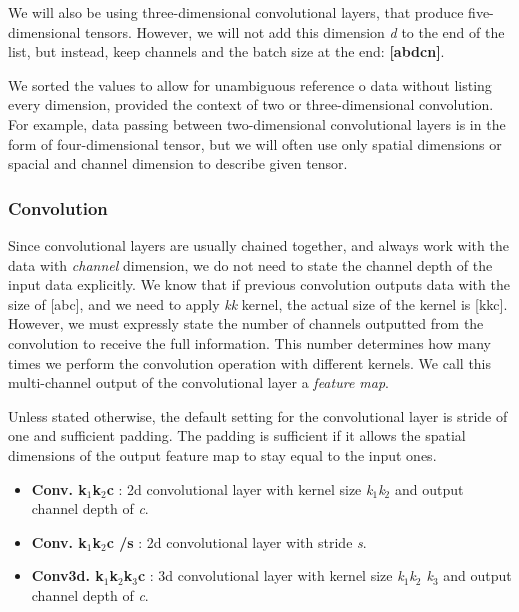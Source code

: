 We will also be using three-dimensional convolutional layers, that produce five-dimensional tensors. However, we will not add this dimension \textit{d} to the end of the list, but instead, keep channels and the batch size at the end: \textbf{[a\x b\x d\x c\x n]}. 

We sorted the values to allow for unambiguous reference o data without listing every dimension, provided the context of two or three-dimensional convolution. For example, data passing between two-dimensional convolutional layers is in the form of four-dimensional tensor, but we will often use only spatial dimensions or spacial and channel dimension to describe given tensor.

\subsubsection*{Convolution}
Since convolutional layers are usually chained together, and always work with the data with \textit{channel} dimension, we do not need to state the channel depth of the input data explicitly. We know that if previous convolution outputs data with the size of [a\x b\x c], and we need to apply \textit{k\x k} kernel, the actual size of the kernel is [k\x k\x c]. However, we must expressly state the number of channels outputted from the convolution to receive the full information. This number determines how many times we perform the convolution operation with different kernels. We call this multi-channel output of the convolutional layer a \textit{feature map}.

Unless stated otherwise, the default setting for the convolutional layer is stride of one and sufficient padding. The padding is sufficient if it allows the spatial dimensions of the output feature map to stay equal to the input ones.

\begin{itemize}
    \item \textbf{Conv. k$_1$\x k$_2$\x c} : 2d convolutional layer with kernel size \textit{k$_1$\x k$_2$} and output channel depth of \textit{c}.
    
    \item \textbf{Conv. k$_1$\x k$_2$\x c /s} : 2d convolutional layer with stride \textit{s}.
    
    \item \textbf{Conv3d. k$_1$\x k$_2$\x k$_3$\x c} : 3d convolutional layer with kernel size \textit{k$_1$\x k$_2$ \x k$_3$} and output channel depth of \textit{c}. 
\end{itemize}

